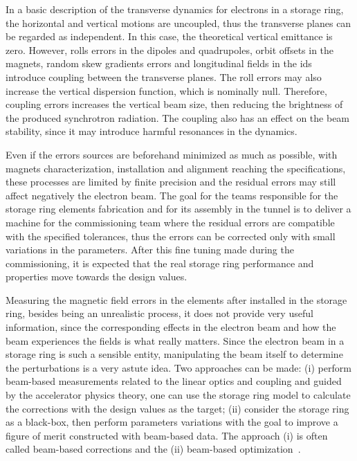 In a basic description of the transverse dynamics for electrons in a storage ring, the horizontal and vertical motions are uncoupled, thus the transverse planes can be regarded as independent. In this case, the theoretical vertical emittance is zero. However, rolls errors in the dipoles and quadrupoles, orbit offsets in the magnets, random skew gradients errors and longitudinal fields in the \glspl{id} introduce coupling between the transverse planes. The roll errors may also increase the vertical dispersion function, which is nominally null. Therefore, coupling errors increases the vertical beam size, then reducing the brightness of the produced synchrotron radiation. The coupling also has an effect on the beam stability, since it may introduce harmful resonances in the dynamics.

Even if the errors sources are beforehand minimized as much as possible, with magnets characterization, installation and alignment reaching the specifications, these processes are limited by finite precision and the residual errors may still affect negatively the electron beam. The goal for the teams responsible for the storage ring elements fabrication and for its assembly in the tunnel is to deliver a machine for the commissioning team where the residual errors are compatible with the specified tolerances, thus the errors can be corrected only with small variations in the parameters. After this fine tuning made during the commissioning, it is expected that the real storage ring performance and properties move towards the design values.

Measuring the magnetic field errors in the elements after installed in the storage ring, besides being an unrealistic process, it does not provide very useful information, since the corresponding effects in the electron beam and how the beam experiences the fields is what really matters. Since the electron beam in a storage ring is such a sensible entity, manipulating the beam itself to determine the perturbations is a very astute idea. Two approaches can be made: (i) perform beam-based measurements related to the linear optics and coupling and guided by the accelerator physics theory, one can use the storage ring model to calculate the corrections with the design values as the target; (ii) consider the storage ring as a black-box, then perform parameters variations with the goal to improve a figure of merit constructed with beam-based data. The approach (i) is often called beam-based corrections and the (ii) beam-based optimization~\cite{huang2019beam}.

